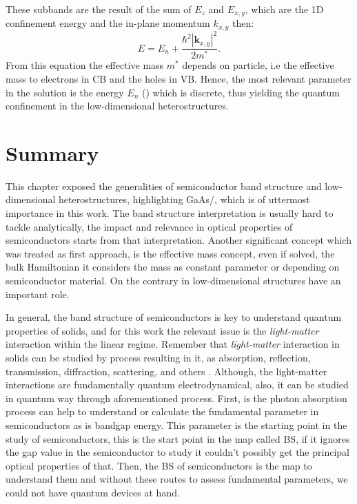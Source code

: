 These subbands are the result of the sum of $E_{z}$ and $E_{x,y}$, which are the 1D confinement energy and the in-plane momentum $k_{x,y}$ then\cite{harrison2016quantum}:
\begin{equation}\label{eqn:chapter-1-total-enery-ema-aprox}		
	E = E_{n} + \dfrac{\hbar^{2}|\boldsymbol{k}_{x,y}|^{2}}{2m^{*}}.
\end{equation}  
From this equation the effective mass  $m^*$ depends on particle, i.e the effective mass to electrons in \gls{CB} and the holes in VB. Hence, the most relevant parameter in the solution is the energy $E_{n}$ () which is discrete, thus yielding the quantum confinement in the low-dimensional
heterostructures.
\section{Summary}
\vspace{-10mm} 
This chapter exposed the generalities of semiconductor band structure and low-dimensional
heterostructures, highlighting GaAs/\algaas, which is of uttermost importance in this work. The band structure interpretation
is usually hard to tackle analytically, the impact and relevance in optical properties of semiconductors starts from that interpretation. Another significant concept which was treated as first approach, is the effective mass concept, even if solved, the bulk Hamiltonian it considers the mass as constant parameter or depending on semiconductor
material. On the contrary in low-dimensional structures have an important role.

In general, the band structure of semiconductors is key to understand quantum
properties of solids, and for this work the relevant issue  is the \emph{light-matter} interaction within the linear regime. Remember that \emph{light-matter} interaction in solids can be studied by process resulting in it, as absorption,
reflection, transmission, diffraction, scattering, and others \cite{rivera2020light}. Although, the light-matter
interactions are fundamentally quantum electrodynamical, also, it can be studied in quantum
way through aforementioned process. First, is the photon absorption process can help
to understand or calculate the fundamental parameter in semiconductors as is bandgap
energy. This parameter is the starting point in the study of semiconductors, this is the start
point in the map called \gls{BS}, if it ignores the gap value in the semiconductor to
study it couldn't possibly get the principal optical properties of that.
Then, the \gls{BS} of semiconductors is the map to understand them and without these routes to assess fundamental
parameters, we could not have quantum devices at hand.
